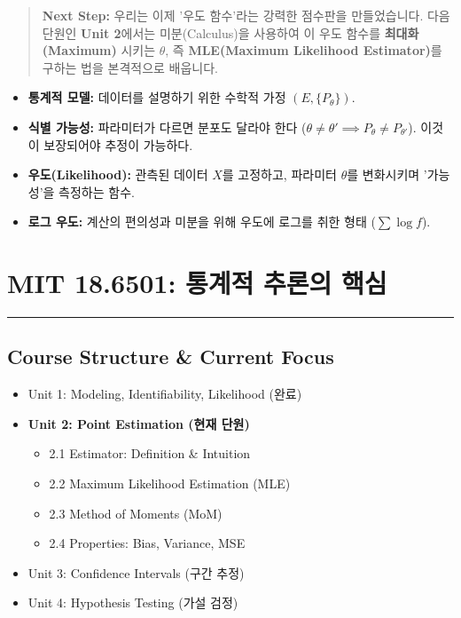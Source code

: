 \documentclass[11pt,a4paper]{book}
\theoremstyle{definition}
\begin{document}
\vspace{1cm}
\begin{quote}
\textbf{Next Step:} 우리는 이제 '우도 함수'라는 강력한 점수판을 만들었습니다. 다음 단원인 \textbf{Unit 2}에서는 미분(Calculus)을 사용하여 이 우도 함수를 \textbf{최대화(Maximum)} 시키는 $\theta$, 즉 \textbf{MLE(Maximum Likelihood Estimator)}를 구하는 법을 본격적으로 배웁니다.
\end{quote}

\begin{summarybox}[title={Unit 1 핵심 요약}]
\begin{itemize}
    \item \textbf{통계적 모델:} 데이터를 설명하기 위한 수학적 가정 $(E, \{P_\theta\})$.
    \item \textbf{식별 가능성:} 파라미터가 다르면 분포도 달라야 한다 ($\theta \neq \theta' \implies P_\theta \neq P_{\theta'}$). 이것이 보장되어야 추정이 가능하다.
    \item \textbf{우도(Likelihood):} 관측된 데이터 $X$를 고정하고, 파라미터 $\theta$를 변화시키며 '가능성'을 측정하는 함수.
    \item \textbf{로그 우도:} 계산의 편의성과 미분을 위해 우도에 로그를 취한 형태 ($\sum \log f$).
\end{itemize}
\end{summarybox}


\chapter{MIT 18.6501: 통계적 추론의 핵심}
\label{ch:lecture2}


\vspace{1cm}
\hrule
\vspace{1cm}

\section*{Course Structure \& Current Focus}
\begin{itemize}
    \item Unit 1: Modeling, Identifiability, Likelihood (완료)
    \item \textbf{\textcolor{mainblue}{Unit 2: Point Estimation (현재 단원)}}
    \begin{itemize}
        \item 2.1 Estimator: Definition \& Intuition
        \item 2.2 Maximum Likelihood Estimation (MLE)
        \item 2.3 Method of Moments (MoM)
        \item 2.4 Properties: Bias, Variance, MSE
    \end{itemize}
    \item Unit 3: Confidence Intervals (구간 추정)
    \item Unit 4: Hypothesis Testing (가설 검정)
\end{itemize}
\end{document}
